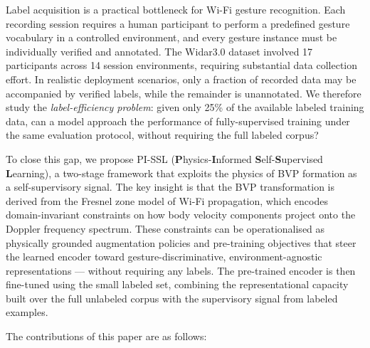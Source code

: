 \documentclass[journal]{IEEEtran}
\begin{document}
Label acquisition is a practical bottleneck for Wi-Fi gesture
recognition.
Each recording session requires a human participant to perform a
predefined gesture vocabulary in a controlled environment, and every
gesture instance must be individually verified and annotated.
The Widar3.0 dataset involved 17 participants across 14 session
environments, requiring substantial data collection effort.
In realistic deployment scenarios, only a fraction of recorded data may
be accompanied by verified labels, while the remainder is unannotated.
We therefore study the \emph{label-efficiency problem}: given only
25\% of the available labeled training data, can a model approach
the performance of fully-supervised training under the same
evaluation protocol, without requiring the full labeled corpus?

To close this gap, we propose PI-SSL
(\textbf{P}hysics-\textbf{I}nformed \textbf{S}elf-\textbf{S}upervised
\textbf{L}earning), a two-stage framework that exploits the physics of
BVP formation as a self-supervisory signal.
The key insight is that the BVP transformation is derived from the
Fresnel zone model of Wi-Fi propagation, which encodes
domain-invariant constraints on how body velocity components project
onto the Doppler frequency spectrum.
These constraints can be operationalised as physically grounded
augmentation policies and pre-training objectives that steer the
learned encoder toward gesture-discriminative, environment-agnostic
representations --- without requiring any labels.
The pre-trained encoder is then fine-tuned using the small labeled
set, combining the representational capacity built over the full
unlabeled corpus with the supervisory signal from labeled examples.

The contributions of this paper are as follows:
\end{document}
